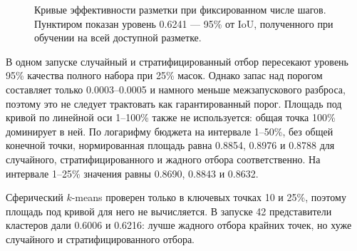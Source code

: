\documentclass[a4paper,12pt]{extarticle}
\begin{document}
\begin{figure}[ht]
  \centering
  \caption{Кривые эффективности разметки при фиксированном числе шагов.
  Пунктиром показан уровень 0.6241 --- 95\% от IoU, полученного при обучении
  на всей доступной разметке.}
  \label{fig:label-efficiency}
\end{figure}

В одном запуске случайный и стратифицированный отбор пересекают уровень 95\%
качества полного набора при 25\% масок. Однако запас над порогом составляет
только 0.0003--0.0005 и намного меньше межзапускового разброса, поэтому это не
следует трактовать как гарантированный порог. Площадь под кривой по линейной
оси 1--100\% также не используется: общая точка 100\% доминирует в ней. По
логарифму бюджета на интервале 1--50\%, без общей конечной точки, нормированная
площадь равна 0.8854, 0.8976 и 0.8788 для случайного, стратифицированного и
жадного отбора соответственно. На интервале 1--25\% значения равны 0.8690,
0.8843 и 0.8632.

Сферический $k$-means проверен только в ключевых точках 10 и 25\%, поэтому
площадь под кривой для него не вычисляется. В запуске 42 представители
кластеров дали 0.6006 и 0.6216: лучше жадного отбора крайних точек, но хуже
случайного и стратифицированного отбора.
\end{document}
